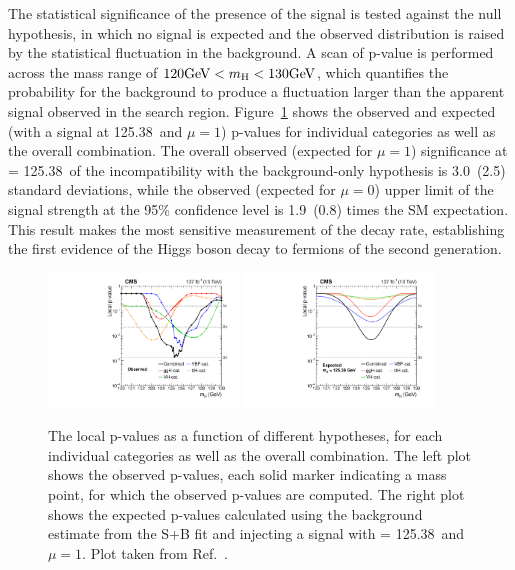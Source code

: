 The statistical significance of the presence of the signal is tested against the null hypothesis,
in which no signal is expected and the observed distribution is raised by the statistical fluctuation in the background.
A scan of p-value is performed across the mass range of $120 \mbox{GeV}< m_{\mathrm{H}} < 130 \mbox{GeV}$, 
which quantifies the probability for the background to produce a fluctuation larger than the apparent signal observed in the search region.
Figure~\ref{fig:p_value_scan} shows the observed and expected (with a signal at 125.38~\GeV and $\mu = 1$) p-values for individual categories as well as the overall combination.
The overall observed (expected for $\mu = 1$) significance at \mh = 125.38~\GeV of the incompatibility with the background-only hypothesis is 3.0~(2.5) standard deviations,
while the observed (expected for $\mu = 0$) upper limit of the signal strength at the 95\% confidence level is 1.9~(0.8) times the SM expectation.
This result makes the most sensitive measurement of the \hmm decay rate, establishing the first evidence of the Higgs boson decay to fermions of the second generation. 

\begin{figure}[!htb]
    \centering
    \captionsetup{justification=justified}
    \includegraphics[width=0.45\textwidth]{pics/results/p-value_obs.pdf}
    \includegraphics[width=0.45\textwidth]{pics/results/p-value_exp.pdf}
    \caption{The local p-values as a function of different \mh hypotheses, 
             for each individual categories as well as the overall combination.
             The left plot shows the observed p-values, 
             each solid marker indicating a mass point, for which the observed p-values are computed.
             The right plot shows the expected p-values calculated using the background estimate from the S+B fit 
             and injecting a signal with \mh = 125.38~\GeV and $\mu = 1$.
             Plot taken from Ref.~\cite{Sirunyan_2021}.}
    \label{fig:p_value_scan}
\end{figure}

